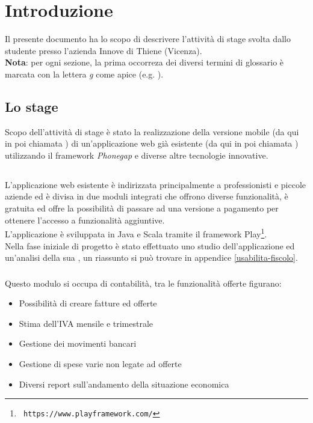 \section{Introduzione}

Il presente documento ha lo scopo di descrivere l'attività di stage
svolta dallo studente presso l'azienda Innove di Thiene (Vicenza). \\

\textbf{Nota}: per ogni sezione, la prima occorreza dei diversi termini di glossario 
è marcata con la lettera \textit{g} come apice (e.g. ).

\subsection{Lo stage}
Scopo dell'attività di stage è stato la realizzazione della versione
mobile (da qui in poi chiamata \fiscoloMobile) di un'applicazione web 
già esistente (da qui in poi chiamata \fiscoloWeb) utilizzando il
framework \textit{Phonegap} e diverse altre tecnologie innovative.

\subsection[\fiscoloWeb]{\fiscoloWeb}
L'applicazione web esistente è indirizzata principalmente a professionisti
e piccole aziende ed è divisa in due moduli integrati che offrono diverse 
funzionalità, è gratuita ed offre la possibilità di passare ad una versione
a pagamento per ottenere l'accesso a funzionalità aggiuntive. \\
L'applicazione è sviluppata in Java e Scala tramite il framework
Play\footnote{\texttt{ https://www.playframework.com/}}. \\

Nella fase iniziale di progetto è stato effettuato uno studio dell'applicazione
ed un'analisi della sua , un riassunto si può trovare in appendice
\ref{usabilita-fiscolo}.

\subsubsection{\fiscolo}
Questo modulo si occupa di contabilità, tra le funzionalità offerte figurano:

\begin{itemize}
\item Possibilità di creare fatture ed offerte
\item Stima dell'IVA mensile e trimestrale
\item Gestione dei movimenti bancari
\item Gestione di spese varie non legate ad offerte
\item Diversi report sull'andamento della situazione economica
\end{itemize}

